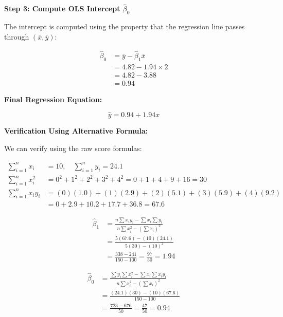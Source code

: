 \documentclass[12pt]{article}
\begin{document}
\begin{solution}
\textbf{Step 3: Compute OLS Intercept $\hat{\beta}_0$}

The intercept is computed using the property that the regression line passes through $(\bar{x}, \bar{y})$:

\begin{align*}
\hat{\beta}_0 &= \bar{y} - \hat{\beta}_1 \bar{x} \\
&= 4.82 - 1.94 \times 2 \\
&= 4.82 - 3.88 \\
&= 0.94
\end{align*}

\textbf{Final Regression Equation:}

\[
\boxed{\hat{y} = 0.94 + 1.94x}
\]

\textbf{Verification Using Alternative Formula:}

We can verify using the raw score formulas:

\begin{align*}
\sum_{i=1}^{n} x_i &= 10, \quad \sum_{i=1}^{n} y_i = 24.1 \\
\sum_{i=1}^{n} x_i^2 &= 0^2 + 1^2 + 2^2 + 3^2 + 4^2 = 0 + 1 + 4 + 9 + 16 = 30 \\
\sum_{i=1}^{n} x_i y_i &= (0)(1.0) + (1)(2.9) + (2)(5.1) + (3)(5.9) + (4)(9.2) \\
&= 0 + 2.9 + 10.2 + 17.7 + 36.8 = 67.6
\end{align*}

\begin{align*}
\hat{\beta}_1 &= \frac{n\sum x_i y_i - \sum x_i \sum y_i}{n\sum x_i^2 - (\sum x_i)^2} \\
&= \frac{5(67.6) - (10)(24.1)}{5(30) - (10)^2} \\
&= \frac{338 - 241}{150 - 100} = \frac{97}{50} = 1.94
\end{align*}

\begin{align*}
\hat{\beta}_0 &= \frac{\sum y_i \sum x_i^2 - \sum x_i \sum x_i y_i}{n\sum x_i^2 - (\sum x_i)^2} \\
&= \frac{(24.1)(30) - (10)(67.6)}{150 - 100} \\
&= \frac{723 - 676}{50} = \frac{47}{50} = 0.94
\end{align*}
\end{solution}
\end{document}

